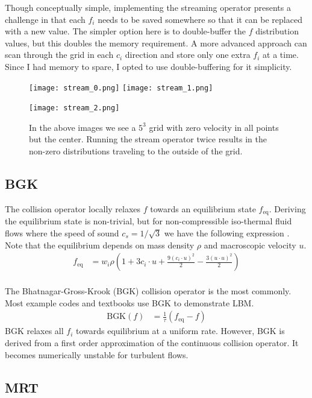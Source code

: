 Though conceptually simple, implementing the streaming
operator presents a challenge in that 
each $f_i$ needs to be saved somewhere so that 
it can be replaced with a new value.
The simpler option here is to double-buffer the $f$ distribution
values, but this doubles the memory requirement.
A more advanced approach can scan through the grid in each 
$c_i$ direction and store only one extra $f_i$ at a time.
Since I had memory to spare,
I opted to use double-buffering for it simplicity.

\begin{figure}
  \begin{center}
    \texttt{[image: stream\_0.png]}
    \texttt{[image: stream\_1.png]}

    \texttt{[image: stream\_2.png]}
  \end{center}
  \caption{In the above images we see a $5^3$ grid with zero
  velocity in all points but the center.
Running the stream operator twice results in the 
non-zero distributions traveling to the outside of the grid.}
\label{fig:stream_example}
\end{figure}

\subsection{BGK}
The collision operator locally relaxes $f$ towards
an equilibrium state $f_{\text{eq}}$.
Deriving the equilibrium state is non-trivial,
but for non-compressible iso-thermal fluid flows
where the speed of sound $c_s = 1 / \sqrt{3}$ we 
have the following expression \cite{Kruger2018}.
Note that the equilibrium depends on mass density $\rho$ and 
macroscopic velocity $u$.
\begin{align*}
   f_{\text{eq}} &= w_i \rho \left(
1 + 3 c_i \cdot u  + \frac{9 (c_i \cdot u)^2}{2}
- \frac{3 (u \cdot u)^2}{2}\right) \\
\end{align*}

The Bhatnagar-Gross-Krook (BGK) collision operator
is the most commonly.
Most example codes and textbooks use BGK to demonstrate
LBM.
\begin{align*}
    \text{BGK}(f) &= \frac{1}{\tau} (f_{\text{eq}} - f)
\end{align*}
BGK relaxes all $f_i$ towards equilibrium at a uniform rate.
However, BGK is derived from a first order approximation
of the continuous collision operator.
It becomes numerically unstable for turbulent flows.

\subsection{MRT}

